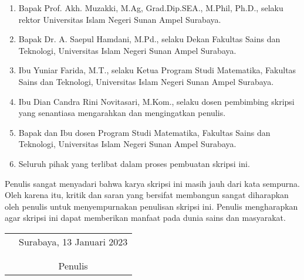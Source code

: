 \documentclass[]{mathuinsa}
\begin{document}
    \begin{enumerate}
        \item Bapak Prof. Akh. Muzakki, M.Ag, Grad.Dip.SEA., M.Phil, Ph.D., selaku rektor Universitas Islam Negeri Sunan Ampel Surabaya.
        \item Bapak Dr. A. Saepul Hamdani, M.Pd., selaku Dekan Fakultas Sains dan Teknologi, Universitas Islam Negeri Sunan Ampel Surabaya.
        \item Ibu Yuniar Farida, M.T., selaku Ketua Program Studi Matematika, Fakultas Sains dan Teknologi, Universitas Islam Negeri Sunan Ampel Surabaya.
        \item Ibu Dian Candra Rini Novitasari, M.Kom., selaku dosen pembimbing skripsi yang senantiasa mengarahkan dan mengingatkan penulis.
        \item Bapak dan Ibu dosen Program Studi Matematika, Fakultas Sains dan Teknologi, Universitas Islam Negeri Sunan Ampel Surabaya.
        \item Seluruh pihak yang terlibat dalam proses pembuatan skripsi ini.
    \end{enumerate}

    Penulis sangat menyadari bahwa karya skripsi ini masih jauh dari kata sempurna. Oleh karena itu, kritik dan saran yang bersifat membangun sangat diharapkan oleh penulis untuk menyempurnakan penulisan skripsi ini. Penulis mengharapkan agar skripsi ini dapat memberikan manfaat pada dunia sains dan masyarakat.
    \vspace{0.8cm}

    \begin{tabular}{p{7cm}c}
        &Surabaya, 13 Januari 2023\\
        &\\
        &\\
        &Penulis
    \end{tabular}


    \newpage{}
    \makeatletter\renewcommand{}\makeatother
    \begin{onehalfspacing}\tableofcontents\end{onehalfspacing}
\end{document}
